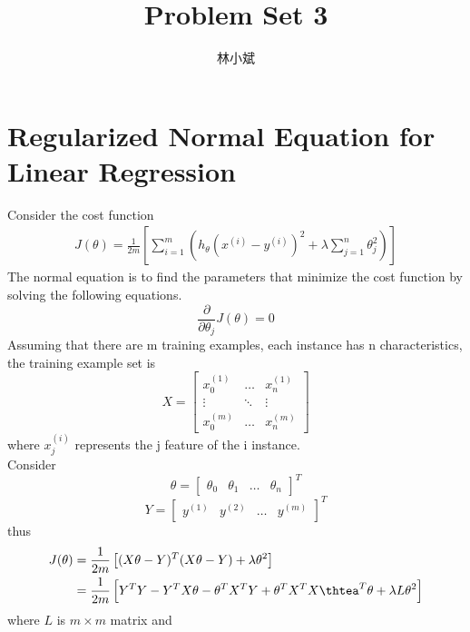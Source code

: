 \documentclass[UTF8]{article}
\author {林小斌}
\title {Problem Set 3}
\begin{document}
\maketitle

\section{Regularized Normal Equation for Linear Regression}
\noindent Consider the cost function
\begin{align*}
  J(\theta)=\frac{1}{2m} \left[
  \sum_{i=1}^m(h_\theta(x^{(i)}-y^{(i)})^2 + \lambda\sum_{j=1}^n\theta_j^2)
  \right]
\end{align*}
The normal equation is to find the parameters that minimize the cost function by solving the following equations.
\begin{equation*}
  \frac{\partial}{\partial\theta_j}J(\theta) = 0
\end{equation*}
Assuming that there are m training examples, each instance has n characteristics, the training example set is
\begin{equation*}
  X = \left[
  \begin{matrix}
      x_0^{(1)} & \dots &x_n^{(1)} \\
      \vdots & \ddots & \vdots \\
      x_0^{(m)} & \dots & x_n^{(m)}
  \end{matrix}
\right]
\end{equation*}
where $x_j^{(i)}$ represents the j feature of the i instance.\\
Consider
\begin{equation*}
  \theta = \left[
  \begin{matrix}
    \theta_0 & \theta_1 & \dots & \theta_n
  \end{matrix}
  \right]^T
\end{equation*}
\begin{equation*}
  Y = \left[
  \begin{matrix}
  y^{(1)} & y^{(2)} & \dots & y^{(m)}
  \end{matrix}
  \right]^T
\end{equation*}
thus
\begin{align*}
  J(\theta) &= \frac{1}{2m} \left[
   (X\theta - Y)^T(X\theta - Y) + \lambda\theta^2
  \right] \\
  &= \frac{1}{2m} \left[
   Y^TY - Y^TX\theta - \theta^TX^TY + \theta^TX^TX\thtea^T\theta + \lambda L\theta^2
  \right]
\end{align*}
where $L$ is $m \times m$ matrix and
\end{document}
